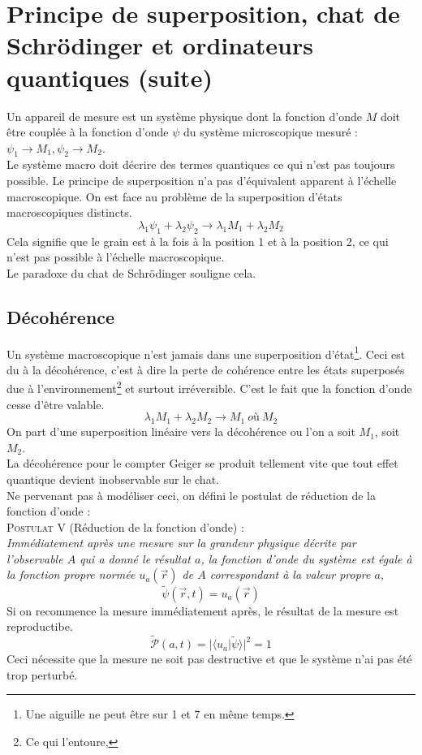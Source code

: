 \documentclass	[11pt, a4paper, openany]{book}
\begin{document}
\section{Principe de superposition, chat de Schrödinger et ordinateurs quantiques (suite)}
Un appareil de mesure est un système physique dont la fonction d'onde $M$ doit être couplée à la fonction d'onde $\psi$ du système microscopique mesuré : $\psi_1 \rightarrow M_1, \psi_2 \rightarrow M_2$.\\
Le système macro doit décrire des termes quantiques ce qui n'est pas toujours possible. Le principe de superposition n'a pas d'équivalent apparent à l'échelle macroscopique. On est face au problème de la superposition d'états macroscopiques distincts.
\begin{equation}
\lambda_1\psi_1 + \lambda_2\psi_2 \rightarrow \lambda_1M_1 + \lambda_2M_2
\end{equation}
Cela signifie que le grain est à la fois à la position 1 et à la position 2, ce qui n'est pas possible à l'échelle macroscopique.\\
Le paradoxe du chat de Schrödinger souligne cela.

\subsection*{Décohérence}
Un système macroscopique n'est jamais dans une superposition d'état\footnote{Une aiguille ne peut être sur 1 et 7 en même temps.}. Ceci est du à la décohérence, c'est à dire la perte de cohérence entre les états superposés due à l'environnement\footnote{Ce qui l'entoure, } et surtout irréversible. C'est le fait que la fonction d'onde cesse d'être valable.
\begin{equation}
\lambda_1M_1 + \lambda_2M_2 \rightarrow M_1\ \textit{où}\ M_2
\end{equation}
On part d'une superposition linéaire vers la décohérence ou  l'on a soit $M_1$, soit $M_2$.\\
La décohérence pour le compter Geiger se produit tellement vite que tout effet quantique devient inobservable sur le chat.\\
Ne pervenant pas à modéliser ceci, on défini le postulat de réduction de la fonction d'onde :\\

\textsc{Postulat V} (Réduction de la fonction d'onde) :\\
\textit{Immédiatement après une mesure sur la grandeur physique décrite par l'observable $A$ qui a donné le résultat $a$, la fonction d'onde du système est égale à la fonction propre normée $u_a(\vec{r})$ de $A$ correspondant à la valeur propre $a$,}
\begin{equation}
\tilde{\psi}(\vec{r},t) = u_a(\vec{r})
\end{equation}
Si on recommence la mesure immédiatement après, le résultat de la mesure est reproductibe.
\begin{equation}
\tilde{\mathcal{P}}(a,t) = |\langle u_a|\tilde{\psi}\rangle |^2 = 1
\end{equation}
Ceci nécessite que la mesure ne soit pas destructive et que le système n'ai pas été trop perturbé.\\
\end{document}
